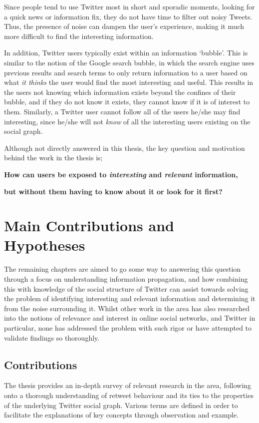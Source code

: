 Since people tend to use Twitter most in short and sporadic moments, looking for a quick news or information fix, they do not have time to filter out noisy Tweets. Thus, the presence of noise can dampen the user's experience, making it much more difficult to find the interesting information.

In addition, Twitter users typically exist within an information `bubble'. This is similar to the notion of the Google search bubble, in which the search engine uses previous results and search terms to only return information to a user based on what \textit{it thinks} the user would find the most interesting and useful. This results in the users not knowing which information exists beyond the confines of their bubble, and if they do not know it exists, they cannot know if it is of interest to them. Similarly, a Twitter user cannot follow all of the users he/she may find interesting, since he/she will not \textit{know} of all the interesting users existing on the social graph.

Although not directly answered in this thesis, the key question and motivation behind the work in the thesis is;\\
\centerline{\textbf{How can users be exposed to \textit{interesting} and \textit{relevant} information,}}
\centerline{\textbf{but without them having to know about it or look for it first?}}


\section{Main Contributions and Hypotheses}
The remaining chapters are aimed to go some way to answering this question through a focus on understanding information propagation, and how combining this with knowledge of the social structure of Twitter can assist towards solving the problem of identifying interesting and relevant information and determining it from the noise surrounding it. Whilst other work in the area has also researched into the notions of relevance and interest in online social networks, and Twitter in particular, none has addressed the problem with such rigor or have attempted to validate findings so thoroughly.

\subsection{Contributions}
The thesis provides an in-depth survey of relevant research in the area, following onto a thorough understanding of retweet behaviour and its ties to the properties of the underlying Twitter social graph. Various terms are defined in order to facilitate the explanations of key concepts through observation and example. 

